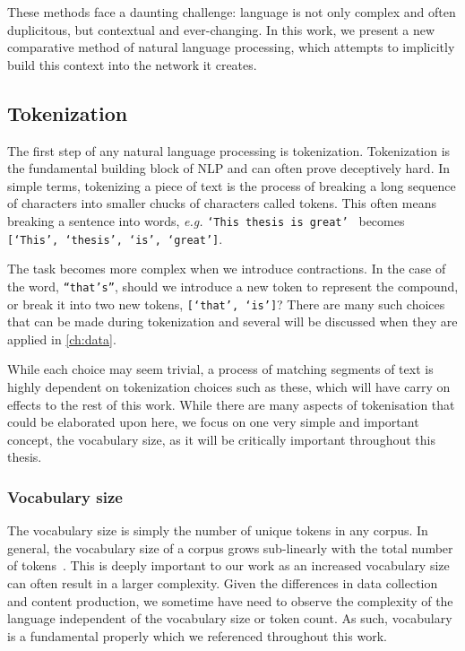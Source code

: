 These methods face a daunting challenge: language is not only complex and often duplicitous, but contextual and ever-changing. In this work, we present a new comparative method of natural language processing, which attempts to implicitly build this context into the network it creates.

\subsection{Tokenization}\label{sec:tokenization}
The first step of any natural language processing is tokenization. Tokenization is the fundamental building block of NLP and can often prove deceptively hard. In simple terms, tokenizing a piece of text is the process of breaking a long sequence of characters into smaller chucks of characters called tokens. This often means breaking a sentence into words, \emph{e.g.} \texttt{`This thesis is great' } becomes \texttt{[`This', `thesis', `is',  `great']}.

The task becomes more complex when we introduce contractions. In the case of the word, \texttt{``that's''}, should we introduce a new token to represent the compound, or break it into two new tokens, \texttt{[`that', `is']}? There are many such choices that can be made during tokenization and several will be discussed when they are applied in \autoref{ch:data}.

While each choice may seem trivial, a process of matching segments of text is highly dependent on tokenization choices such as these, which will have carry on effects to the rest of this work. While there are many aspects of tokenisation that could be elaborated upon here, we focus on one very simple and important concept, the vocabulary size, as it will be critically important throughout this thesis. 


\subsubsection{Vocabulary size}\label{sec:background_vocab_sizes}


The vocabulary size is simply the number of unique tokens in any corpus. In general, the vocabulary size of a corpus grows sub-linearly with the total number of tokens~\cite{heaps1978information}. This is deeply important to our work as an increased vocabulary size can often result in a larger complexity. Given the differences in data collection and content production, we sometime have need to observe the complexity of the language independent of the vocabulary size or token count. As such, vocabulary is a fundamental properly which we referenced throughout this work.

